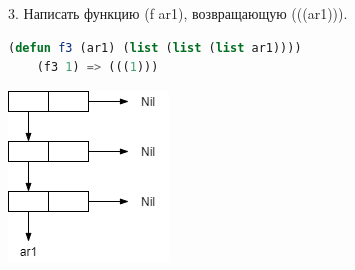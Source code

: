 \documentclass[12pt]{report}
\begin{document}
3. Написать функцию (f ar1), возвращающую (((ar1))).
\begin{lstlisting}[language=Lisp]
	(defun f3 (ar1) (list (list (list ar1))))
	(f3 1) => (((1)))
\end{lstlisting}

\includegraphics[scale=0.7]{img/3}

	
	
	
\end{document}
